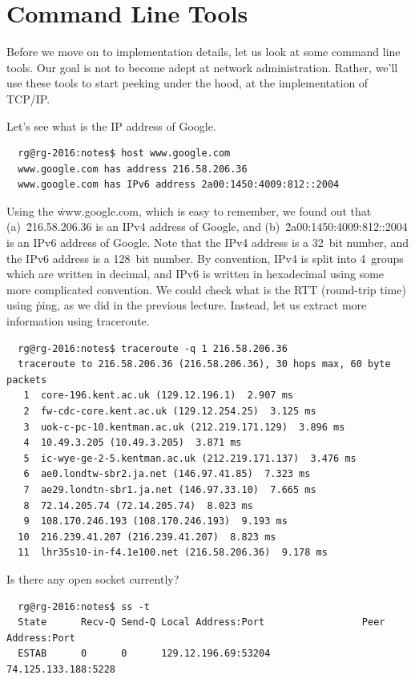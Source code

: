 


\section*{Command Line Tools}

Before we move on to implementation details,
  let us look at some command line tools.
Our goal is not to become adept at network administration.
Rather, we'll use these tools to start peeking under the hood,
  at the implementation of TCP/IP\null.

Let's see what is the IP address of Google.
{\footnotesize
\begin{verbatim}
  rg@rg-2016:notes$ host www.google.com
  www.google.com has address 216.58.206.36
  www.google.com has IPv6 address 2a00:1450:4009:812::2004
\end{verbatim}
}\noindent
Using the  \.{www.google.com},
  which is easy to remember,
  we found out that
    (a)~\.{216.58.206.36} is an IPv4 address of Google, and
    (b)~\.{2a00:1450:4009:812::2004} is an IPv6 address of Google.
Note that the IPv4 address is a 32~bit number,
  and the IPv6 address is a 128~bit number.
By convention,
  IPv4 is split into 4~groups which are written in decimal,
  and IPv6 is written in hexadecimal using some more complicated convention.
We could check what is the RTT (round-trip time) using \.{ping},
  as we did in the previous lecture.
Instead, let us extract more information using \.{traceroute}.
{\footnotesize
\begin{verbatim}
  rg@rg-2016:notes$ traceroute -q 1 216.58.206.36
  traceroute to 216.58.206.36 (216.58.206.36), 30 hops max, 60 byte packets
   1  core-196.kent.ac.uk (129.12.196.1)  2.907 ms
   2  fw-cdc-core.kent.ac.uk (129.12.254.25)  3.125 ms
   3  uok-c-pc-10.kentman.ac.uk (212.219.171.129)  3.896 ms
   4  10.49.3.205 (10.49.3.205)  3.871 ms
   5  ic-wye-ge-2-5.kentman.ac.uk (212.219.171.137)  3.476 ms
   6  ae0.londtw-sbr2.ja.net (146.97.41.85)  7.323 ms
   7  ae29.londtn-sbr1.ja.net (146.97.33.10)  7.665 ms
   8  72.14.205.74 (72.14.205.74)  8.023 ms
   9  108.170.246.193 (108.170.246.193)  9.193 ms
  10  216.239.41.207 (216.239.41.207)  8.823 ms
  11  lhr35s10-in-f4.1e100.net (216.58.206.36)  9.178 ms
\end{verbatim}
}\noindent
Is there any open socket currently?
{\footnotesize
\begin{verbatim}
  rg@rg-2016:notes$ ss -t
  State      Recv-Q Send-Q Local Address:Port                 Peer Address:Port                
  ESTAB      0      0      129.12.196.69:53204                74.125.133.188:5228  
\end{verbatim}
}\noindent
